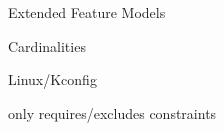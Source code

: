 \begin{frame}{\insertsubsection}
	Extended Feature Models
	

	Cardinalities

	Linux/Kconfig %

	only requires/excludes constraints
\end{frame}








